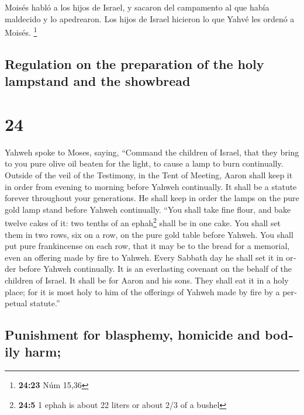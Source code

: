 \begin{paracol}{2}
 Moisés habló a los hijos de Israel, y sacaron del
campamento al que había maldecido y lo apedrearon. Los hijos de Israel
hicieron lo que Yahvé les ordenó a Moisés. \footnote{\textbf{24:23} Núm
  15,36}

\switchcolumn
\begin{otherlanguage}{english}

\hypertarget{regulation-on-the-preparation-of-the-holy-lampstand-and-the-showbread}{%
\subsection{Regulation on the preparation of the holy lampstand and the
showbread}\label{regulation-on-the-preparation-of-the-holy-lampstand-and-the-showbread}}

\hypertarget{section-47}{%
\section{24}\label{section-47}}

 Yahweh spoke to Moses, saying,  ``Command
the children of Israel, that they bring to you pure olive oil beaten for
the light, to cause a lamp to burn continually.  Outside
of the veil of the Testimony, in the Tent of Meeting, Aaron shall keep
it in order from evening to morning before Yahweh continually. It shall
be a statute forever throughout your generations.  He
shall keep in order the lamps on the pure gold lamp stand before Yahweh
continually.  ``You shall take fine flour, and bake twelve
cakes of it: two tenths of an ephah\footnote{\textbf{24:5} 1 ephah is
  about 22 liters or about 2/3 of a bushel} shall be in one cake.
 You shall set them in two rows, six on a row, on the pure
gold table before Yahweh.  You shall put pure frankincense
on each row, that it may be to the bread for a memorial, even an
offering made by fire to Yahweh.  Every Sabbath day he
shall set it in order before Yahweh continually. It is an everlasting
covenant on the behalf of the children of Israel.  It
shall be for Aaron and his sons. They shall eat it in a holy place; for
it is most holy to him of the offerings of Yahweh made by fire by a
perpetual statute.''

\hypertarget{punishment-for-blasphemy-homicide-and-bodily-harm}{%
\subsection{Punishment for blasphemy, homicide and bodily
harm;}\label{punishment-for-blasphemy-homicide-and-bodily-harm}}


\end{otherlanguage}
\end{paracol}
